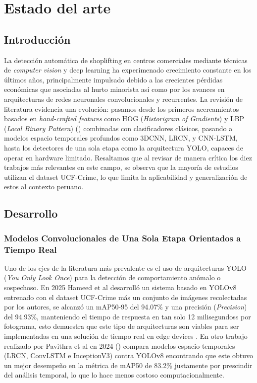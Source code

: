 	\section{Estado del arte}
  	
	\subsection{Introducción}
  
  La detección automática de shoplifting en centros comerciales mediante técnicas de \textit{computer vision} y deep learning ha experimenado crecimiento constante en los últimos años, principalmente impulsado debido a las crecientes pérdidas económicas que asociadas al hurto minorista así como por los avances en arquitecturas de redes neuronales convolucionales y recurrentes. La revisión de literatura evidencia una evolución: pasamos desde los primeros acercamientos basados en \textit{hand-crafted features} como HOG (\textit{Historigram of Gradients}) y LBP (\textit{Local Binary Pattern}) (\cite{m_deep_2023}) combinadas con clasificadores clásicos, pasando a modelos espacio temporales profundos como 3DCNN, LRCN, y CNN-LSTM, hasta los detectores de una sola etapa como la arquitectura YOLO, capaces de operar en hardware limitado. Resaltamos que al revisar de manera crítica los diez trabajos más relevantes en este campo, se observa que la mayoría de estudios utilizan el dataset UCF-Crime, lo que limita la aplicabilidad y generalización de estos al contexto peruano.
  
  
	\subsection{Desarrollo}
	
	\subsubsection{Modelos Convolucionales de Una Sola Etapa Orientados a Tiempo Real}
  
    Uno de los ejes de la literatura más prevalente es el uso de arquitecturas YOLO (\textit{You Only Look Once}) para la detección de comportamiento
    anómalo o sospechoso. En 2025 Hameed et al desarrolló un sistema basado en YOLOv8 entrenado con el dataset UCF-Crime más un conjunto de
    imágenes recolectadas por los autores, se alcanzó un mAP50-95 del 94.07\% y una precisión (\textit{Precision}) del 94.93\%, manteniendo el tiempo de respuesta en tan solo     12 milisegundoss por fotograma, esto demuestra que este tipo de arquitecturas son viables para ser implementadas en una solución de tiempo real en edge devices \cite{hameed_real_2025}. En otro trabajo realizado por Pavithra et al en 2024 (\cite{v_deep_2024}) compara modelos espacio-temporales (LRCN, ConvLSTM e InceptionV3) contra YOLOv8 encontrando que este obtuvo un mejor desempeño en la métrica de mAP50 de 83.2\% justamente por prescindir del análisis temporal, lo que lo hace menos costoso computacionalmente.
    
